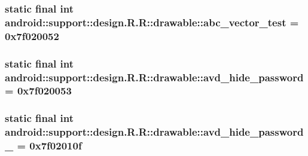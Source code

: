\hypertarget{classandroid_1_1support_1_1design_1_1_r_1_1drawable_252676bd7430f08fd081bdd8be49b728}{
\subsubsection[{abc\_\-vector\_\-test}]{\setlength{\rightskip}{0pt plus 5cm}static final int android::support::design.R.R::drawable::abc\_\-vector\_\-test = 0x7f020052}}
\label{classandroid_1_1support_1_1design_1_1_r_1_1drawable_252676bd7430f08fd081bdd8be49b728}


\hypertarget{classandroid_1_1support_1_1design_1_1_r_1_1drawable_a807bcf81721f78e39ebef9f326dd9a4}{
\subsubsection[{avd\_\-hide\_\-password}]{\setlength{\rightskip}{0pt plus 5cm}static final int android::support::design.R.R::drawable::avd\_\-hide\_\-password = 0x7f020053}}
\label{classandroid_1_1support_1_1design_1_1_r_1_1drawable_a807bcf81721f78e39ebef9f326dd9a4}


\hypertarget{classandroid_1_1support_1_1design_1_1_r_1_1drawable_3b91181ac64d23e6cc0f400633ce1ba6}{
\subsubsection[{avd\_\-hide\_\-password\_\-1}]{\setlength{\rightskip}{0pt plus 5cm}static final int android::support::design.R.R::drawable::avd\_\-hide\_\-password\_ = 0x7f02010f}}
\label{classandroid_1_1support_1_1design_1_1_r_1_1drawable_3b91181ac64d23e6cc0f400633ce1ba6}


